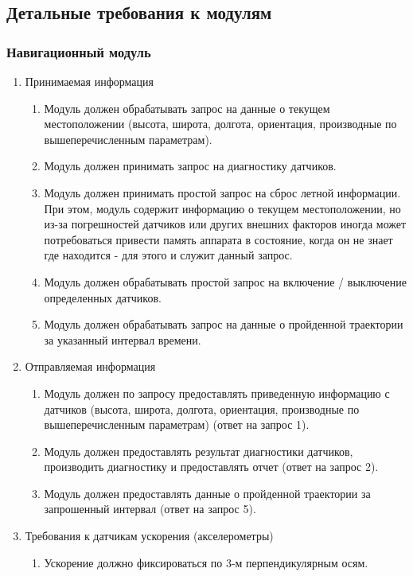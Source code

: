 \documentclass[utf8]{report}
\begin{document}
\subsection{Детальные требования к модулям}

\subsubsection{Навигационный модуль}
\begin{enumerate}
  \item Принимаемая информация
  \begin{enumerate}
    \item Модуль должен обрабатывать запрос на данные о текущем местоположении (высота, широта, долгота, ориентация, производные по вышеперечисленным параметрам).
    \item Модуль должен принимать запрос на диагностику датчиков.
    \item Модуль должен принимать простой запрос на сброс летной информации. При этом, модуль содержит информацию о текущем местоположении, но из-за погрешностей датчиков или других внешних факторов иногда может потребоваться привести память аппарата в состояние, когда он не знает где находится - для этого и служит данный запрос.
    \item Модуль должен обрабатывать простой запрос на включение / выключение определенных датчиков.
    \item Модуль должен обрабатывать запрос на данные о пройденной траектории за указанный интервал времени.
  \end{enumerate}
  \item Отправляемая информация
  \begin{enumerate}
    \item Модуль должен по запросу предоставлять приведенную информацию с датчиков (высота, широта, долгота, ориентация, производные по вышеперечисленным параметрам) (ответ на запрос 1).
    \item Модуль должен предоставлять результат диагностики датчиков, производить диагностику и предоставлять отчет (ответ на запрос 2).
    \item Модуль должен предоставлять данные о пройденной траектории за запрошенный интервал (ответ на запрос 5).
  \end{enumerate}
  \item Требования к датчикам ускорения (акселерометры)
  \begin{enumerate}
    \item Ускорение должно фиксироваться по 3-м перпендикулярным осям.

\end{enumerate}
\end{enumerate}
\end{document}
